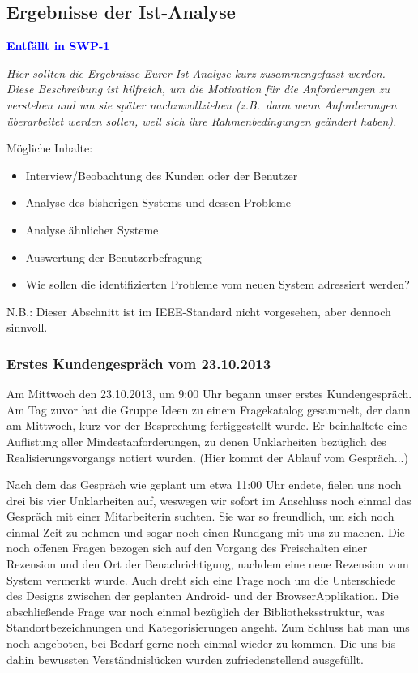\documentclass[fontsize=12pt,paper=a4,twoside]{scrartcl}
\newcommand{\highlight}[1]{\textcolor{blue}{\textbf{#1}}}
\newcommand{\nurlangversion}[0]{%
\ifthenelse{\boolean{langversion}}{\highlight{Muss in SWP-2 ausgefüllt werden}}
{\highlight{Entfällt in SWP-1}}}
\begin{document}
\subsection{Ergebnisse der Ist-Analyse}
\nurlangversion

  {\em Hier sollten die Ergebnisse Eurer Ist-Analyse kurz
  zusammengefasst werden. Diese Beschreibung ist hilfreich, um die
  Motivation für die Anforderungen zu verstehen und um sie später
  nachzuvollziehen (z.B.\ dann wenn Anforderungen überarbeitet werden
  sollen, weil sich ihre Rahmenbedingungen geändert haben).
  
  Mögliche Inhalte: 
  \begin{itemize}
    \item Interview/Beobachtung des Kunden oder der Benutzer
    \item Analyse des bisherigen Systems und dessen Probleme 
    \item Analyse ähnlicher Systeme
    \item Auswertung der Benutzerbefragung
    \item Wie sollen die identifizierten Probleme vom neuen System adressiert werden?
  \end{itemize}
  
  N.B.: Dieser Abschnitt ist im IEEE-Standard nicht vorgesehen, aber dennoch
  sinnvoll.}

\newpage
\subsubsection{Erstes Kundengespräch vom 23.10.2013}

Am Mittwoch den 23.10.2013, um 9:00 Uhr begann unser erstes Kundengespräch.
Am Tag zuvor hat die Gruppe Ideen zu einem Fragekatalog gesammelt, der dann
am Mittwoch, kurz vor der Besprechung fertiggestellt wurde. Er beinhaltete
eine Auflistung aller Mindestanforderungen, zu denen Unklarheiten bezüglich 
des Realisierungsvorgangs notiert wurden. (Hier kommt der Ablauf vom Gespräch...)

Nach dem das Gespräch wie geplant um etwa 11:00 Uhr endete, fielen uns noch 
drei bis vier Unklarheiten auf, weswegen wir sofort im Anschluss noch einmal das Gespräch mit einer Mitarbeiterin suchten. Sie war so freundlich, um sich noch 
einmal Zeit zu nehmen und sogar noch einen Rundgang mit uns zu machen. Die noch 
offenen Fragen bezogen sich auf den Vorgang des Freischalten einer Rezension
und den Ort der Benachrichtigung, nachdem eine neue Rezension vom System vermerkt
wurde. Auch dreht sich eine Frage noch um die Unterschiede des Designs zwischen
der geplanten Android- und der BrowserApplikation. Die abschließende Frage war 
noch einmal bezüglich der Bibliotheksstruktur, was Standortbezeichnungen und
Kategorisierungen angeht. Zum Schluss hat man uns noch angeboten, bei Bedarf gerne 
noch einmal wieder zu kommen. Die uns bis dahin bewussten Verständnislücken
wurden zufriedenstellend ausgefüllt. 
\end{document}
